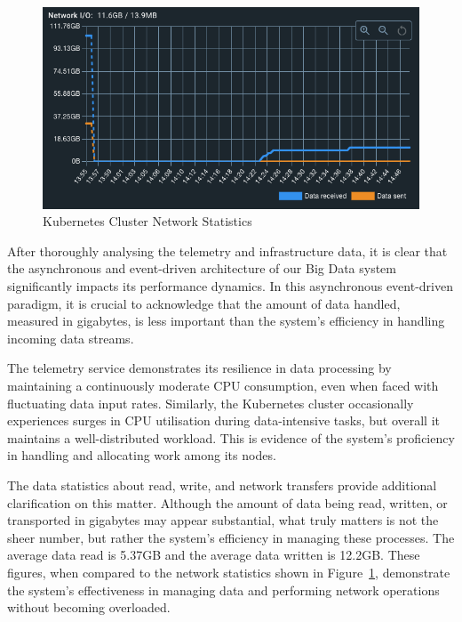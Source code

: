 \documentclass[journal]{IEEEtran}
\begin{document}
\begin{figure}
  \centering
  \includegraphics[width=\columnwidth]{images/kubernetes-cluster-network-data-received-and-sent.png}
  \caption{Kubernetes Cluster Network Statistics}
  \label{kubernetesClusterNetworkStatistics}
\end{figure}

After thoroughly analysing the telemetry and infrastructure data, it is clear that the asynchronous and event-driven architecture of our Big Data system significantly impacts its performance dynamics. In this asynchronous event-driven paradigm, it is crucial to acknowledge that the amount of data handled, measured in gigabytes, is less important than the system's efficiency in handling incoming data streams.

The telemetry service demonstrates its resilience in data processing by maintaining a continuously moderate CPU consumption, even when faced with fluctuating data input rates. Similarly, the Kubernetes cluster occasionally experiences surges in CPU utilisation during data-intensive tasks, but overall it maintains a well-distributed workload. This is evidence of the system's proficiency in handling and allocating work among its nodes.

The data statistics about read, write, and network transfers provide additional clarification on this matter. Although the amount of data being read, written, or transported in gigabytes may appear substantial, what truly matters is not the sheer number, but rather the system's efficiency in managing these processes. The average data read is 5.37GB and the average data written is 12.2GB. These figures, when compared to the network statistics shown in Figure~\ref{kubernetesClusterNetworkStatistics}, demonstrate the system's effectiveness in managing data and performing network operations without becoming overloaded.
\end{document}
